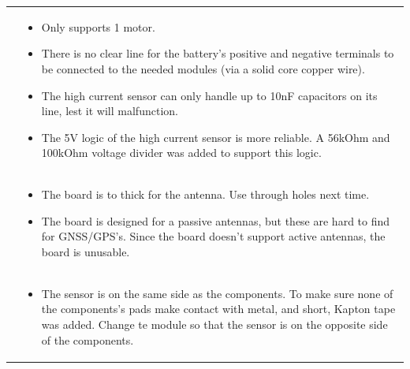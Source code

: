 \documentclass[ti,oneside,10pt]{uantwerpenreport}
\begin{document}
\begin{table}[h!]
\begin{tabular}{p{} p{}}
            \raisebox{-3.33mm}{Power:} & 
            \begin{itemize}
                \item Only supports 1 motor.
                \item There is no clear line for the battery's positive and negative terminals to be connected to the needed modules (via a solid core copper wire).
                \item The high current sensor can only handle up to 10nF capacitors on its line, lest it will malfunction.
                \item The 5V logic of the high current sensor is more reliable.
                      A 56kOhm and 100kOhm voltage divider was added to support this logic.
            \end{itemize} \\
            \raisebox{-3.33mm}{GNSS/GPS:} & 
            \begin{itemize}
                \item The board is to thick for the antenna.
                      Use through holes next time.
                \item The board is designed for a passive antennas, but these are hard to find for GNSS/GPS's.
                      Since the board doesn't support active antennas, the board is unusable.
            \end{itemize} \\
            \raisebox{-3.33mm}{Temperature:} & 
            \begin{itemize}
                \item The sensor is on the same side as the components.
                      To make sure none of the components's pads make contact with metal, and short, Kapton tape was added.
                      Change te module so that the sensor is on the opposite side of the components.
            \end{itemize} \\
        \bottomrule
    \end{tabular}
\end{table}
\newpage
\end{document}

